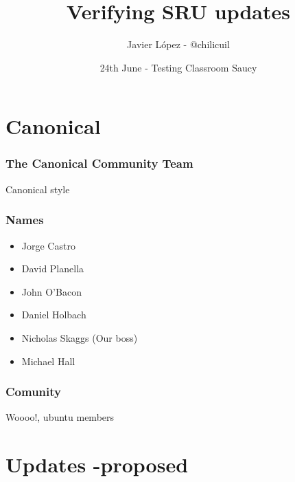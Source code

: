 \documentclass[dvipsnames]{beamer}
\title{Verifying SRU updates}
\author[Javier López]{Javier López - @chilicuil}
\institute[Testing Classroom Saucy]
{\url{https://wiki.ubuntu.com/Testing/Activities/Classroom/Saucy}}
\date[2013]
     {24th June - Testing Classroom Saucy}
\begin{document}
\begin{frame}
  \titlepage
\end{frame}

\section[Sponsor]{Canonical}

\begin{frame}
    \frametitle{The Canonical Community Team}
  \begin{center}
  \end{center}
  \begin{center}
    Canonical style
  \end{center}
\end{frame}

\begin{frame}
  \frametitle{Names}
  \begin{itemize}
  \item Jorge Castro
  \item David Planella
  \item John O'Bacon
  \item Daniel Holbach
  \item Nicholas Skaggs (Our boss)
  \item Michael Hall
  \end{itemize}
\end{frame}

\begin{frame}
  \frametitle{Comunity}
  \begin{center}
  \end{center}
  \begin{center}
    Woooo!, ubuntu members
  \end{center}
\end{frame}

\section[-proposed]{Updates -proposed}
\end{document}
